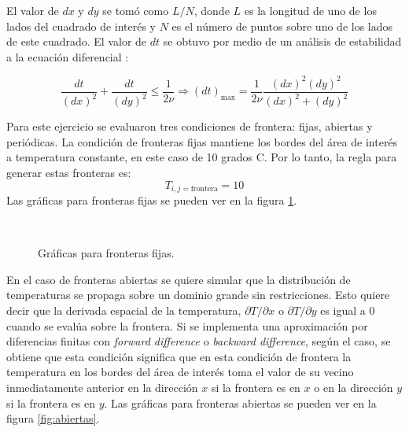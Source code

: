 \documentclass{article}
\begin{document}
El valor de $dx$ y $dy$ se tomó como $L/N$, donde $L$ es la longitud de uno de los lados del cuadrado de interés y $N$ es el número de puntos sobre uno de los lados de este cuadrado. El valor de $dt$ se obtuvo por medio de un análisis de estabilidad a la ecuación diferencial \cite{mit}:

\begin{equation*}
    \frac{dt}{(dx)^2} + \frac{dt}{(dy)^2} \leq \frac{1}{2\nu} \Rightarrow (dt)_{\text{max}} = \frac{1}{2\nu}\frac{(dx)^2(dy)^2}{(dx)^2+(dy)^2}
\end{equation*}

Para este ejercicio se evaluaron tres condiciones de frontera: fijas, abiertas y periódicas. La condición de fronteras fijas mantiene los bordes del área de interés a temperatura constante, en este caso de 10 grados C. Por lo tanto, la regla para generar estas fronteras es:
\begin{equation*}
    T_{i, j = \text{frontera}} = 10
\end{equation*}
Las gráficas para fronteras fijas se pueden ver en la figura \ref{fig:fijas}.
\begin{figure}[h]
\centering
     \\
    \caption{Gráficas para fronteras fijas.}
    \label{fig:fijas}
\end{figure}

En el caso de fronteras abiertas se quiere simular que la distribución de temperaturas se propaga sobre un dominio grande sin restricciones. Esto quiere decir que la derivada espacial de la temperatura, $\partial T/ \partial x$ o $\partial T/ \partial y$ es igual a 0 cuando se evalúa sobre la frontera. Si se implementa una aproximación por diferencias finitas con \textit{forward difference} o \textit{backward difference}, según el caso, se obtiene que esta condición significa que en esta condición de frontera la temperatura en los bordes del área de interés toma el valor de su vecino inmediatamente anterior en la dirección $x$ si la frontera es en $x$ o en la dirección $y$ si la frontera es en $y$. Las gráficas para fronteras abiertas se pueden ver en la figura \ref{fig:abiertas}.
\end{document}
